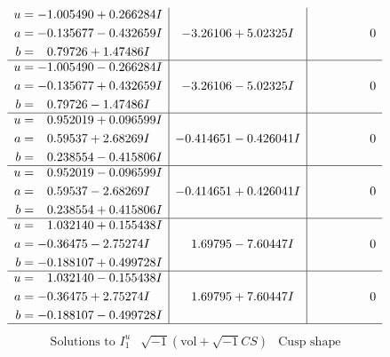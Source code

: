 \documentclass[1p]{elsarticle_modified}
\theoremstyle{definition}
\newcommand{\I}{\sqrt{-1}}
\begin{document}
$$\begin{array}{c|c|c}
\begin{aligned}
u &= -1.005490 + 0.266284 I \\
a &= -0.135677 - 0.432659 I \\
b &= \phantom{-}0.79726 + 1.47486 I\end{aligned}
 & -3.26106 + 5.02325 I & \phantom{-0.000000 } 0 \\ \hline\begin{aligned}
u &= -1.005490 - 0.266284 I \\
a &= -0.135677 + 0.432659 I \\
b &= \phantom{-}0.79726 - 1.47486 I\end{aligned}
 & -3.26106 - 5.02325 I & \phantom{-0.000000 } 0 \\ \hline\begin{aligned}
u &= \phantom{-}0.952019 + 0.096599 I \\
a &= \phantom{-}0.59537 + 2.68269 I \\
b &= \phantom{-}0.238554 - 0.415806 I\end{aligned}
 & -0.414651 - 0.426041 I & \phantom{-0.000000 } 0 \\ \hline\begin{aligned}
u &= \phantom{-}0.952019 - 0.096599 I \\
a &= \phantom{-}0.59537 - 2.68269 I \\
b &= \phantom{-}0.238554 + 0.415806 I\end{aligned}
 & -0.414651 + 0.426041 I & \phantom{-0.000000 } 0 \\ \hline\begin{aligned}
u &= \phantom{-}1.032140 + 0.155438 I \\
a &= -0.36475 - 2.75274 I \\
b &= -0.188107 + 0.499728 I\end{aligned}
 & \phantom{-}1.69795 - 7.60447 I & \phantom{-0.000000 } 0 \\ \hline\begin{aligned}
u &= \phantom{-}1.032140 - 0.155438 I \\
a &= -0.36475 + 2.75274 I \\
b &= -0.188107 - 0.499728 I\end{aligned}
 & \phantom{-}1.69795 + 7.60447 I & \phantom{-0.000000 } 0\\
 \hline 
 \end{array}$$\newpage$$\begin{array}{c|c|c}  
\text{Solutions to }I^u_{1}& \I (\text{vol} + \sqrt{-1}CS) & \text{Cusp shape}\\
 \hline 
\begin{aligned}

\end{aligned}
\end{array}$$
\end{document}
